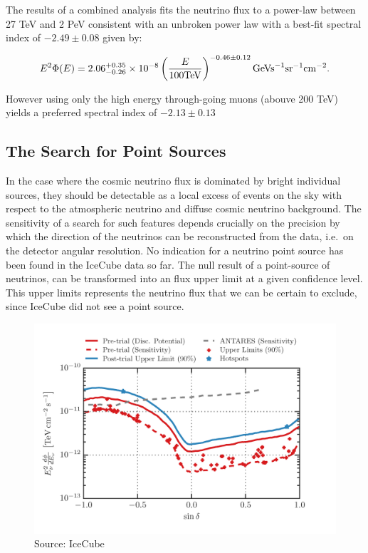 \documentclass[
  letterpaper,
  DIV=11,
  numbers=noendperiod]{scrreprt}
\begin{document}
The results of a combined analysis fits the neutrino flux to a power-law
between 27 TeV and 2 PeV consistent with an unbroken power law with a
best-fit spectral index of \(-2.49 \pm 0.08\) given by:

\[E^2\Phi(E) = 2.06^{+0.35}_{-0.26} \times 10^{-8} \left(\frac{E}{100 \rm{ TeV}}\right)^{-0.46\pm 0.12} \mathrm{ GeV s}^{-1}\rm{ sr}^{-1}\mathrm{ cm}^{-2}.\]

However using only the high energy through-going muons (abouve 200 TeV)
yields a preferred spectral index of \(-2.13\pm 0.13\)

\subsection{The Search for Point
Sources}\label{the-search-for-point-sources}

In the case where the cosmic neutrino flux is dominated by bright
individual sources, they should be detectable as a local excess of
events on the sky with respect to the atmospheric neutrino and diffuse
cosmic neutrino background. The sensitivity of a search for such
features depends crucially on the precision by which the direction of
the neutrinos can be reconstructed from the data, i.e.~on the detector
angular resolution. No indication for a neutrino point source has been
found in the IceCube data so far. The null result of a point-source of
neutrinos, can be transformed into an flux upper limit at a given
confidence level. This upper limits represents the neutrino flux that we
can be certain to exclude, since IceCube did not see a point source.

\begin{figure}[H]

{\centering \includegraphics{images/upperlimits.png}

}

\caption{Source: IceCube}

\end{figure}%
\end{document}
